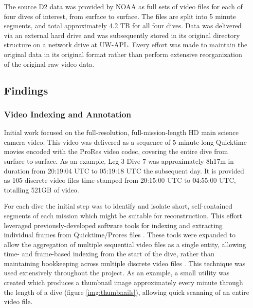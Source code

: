\documentclass[letterpaper,12pt]{article}
\begin{document}
The source D2 data was provided by NOAA as full sets of video files for each of four dives of interest, from surface to surface.   The files are split into 5 minute segments, and total approximately 4.2 TB for all four dives.   Data was delivered via an external hard drive and was subsequently stored in its original directory structure on a network drive at UW-APL.  Every effort was made to maintain the original data in its original format rather than perform extensive reorganization of the original raw video data.

\subsection{Findings}

\subsubsection{Video Indexing and Annotation}

Initial work focused on the full-resolution, full-mission-length HD main science camera video.  This video was delivered as a sequence of 5-minute-long Quicktime movies encoded with the ProRes video codec, covering the entire dive from surface to surface.    As an example, Leg 3 Dive 7 was approximately 8h17m in duration from 20:19:04 UTC to 05:19:18 UTC the subsequent day.  It is provided as 105 discrete video files time-stamped from 20:15:00 UTC to 04:55:00 UTC, totalling 521GB of video. 

For each dive the initial step was to identify and isolate short, self-contained segments of each mission which might be suitable for reconstruction.   This effort leveraged previously-developed software tools for indexing and extracting individual frames from Quicktime/Prores files \cite{goquicktime}.  These tools were expanded to allow the aggregation of multiple sequential video files as a single entity, allowing time- and frame-based indexing from the start of the dive, rather than maintaining bookkeeping across multiple discrete video files \cite{goframeset}.  This technique was used extensively throughout the project.  As an example, a small utility was created which produces a thumbnail image approximately every minute through the length of a dive (figure \ref{img:thumbnails}), allowing quick scanning of an entire video file.
\end{document}
